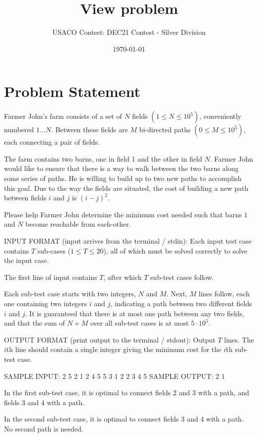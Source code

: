 \documentclass[12pt]{article}
\title{View problem}
\author{USACO Contest: DEC21 Contest - Silver Division}
\date{\today}
\begin{document}
\maketitle

\section*{Problem Statement}

Farmer John's farm consists of a set of $N$ fields $(1 \leq N \leq 10^5)$,
conveniently numbered $1 \ldots N$.  Between these fields are $M$ bi-directed
paths $(0 \leq M \leq 10^5)$, each  connecting a pair of fields.

The farm contains two barns, one in field 1 and the other in field $N$.   Farmer
John would like to ensure that there is a way to walk between the two barns
along some series of paths.  He is willing to build up to two new paths to
accomplish this goal.  Due to the way the fields are situated, the cost of
building a new path between fields $i$ and $j$ is $(i-j)^2$.

Please help Farmer John determine the minimum cost needed such that barns $1$
and $N$ become reachable from each-other.

INPUT FORMAT (input arrives from the terminal / stdin):
Each input test case contains $T$ sub-cases ($1\le T\le 20$), all of which must
be  solved correctly to solve the input case.  

The first line of input contains $T$, after which $T$ sub-test cases follow.

Each sub-test case starts with two integers, $N$ and $M$.  Next, $M$ lines
follow,  each one containing two integers $i$ and $j$, indicating a path between
two different fields $i$ and $j$. It is guaranteed that there is at most one
path between any two fields, and that the sum of $N+M$ over all sub-test cases
is at most $5 \cdot 10^5$.

OUTPUT FORMAT (print output to the terminal / stdout):
Output $T$ lines. The $i$th line should contain a single integer giving the
minimum cost for the $i$th sub-test case.

SAMPLE INPUT:
2
5 2
1 2
4 5
5 3
1 2
2 3
4 5
SAMPLE OUTPUT: 
2
1

In the first sub-test case, it is optimal to connect fields 2 and 3 with a 
path, and fields 3 and 4 with a path.

In the second sub-test case, it is optimal to connect fields 3 and 4 with a
path.  No second path is needed.
\end{document}
